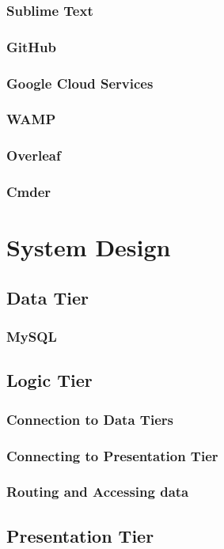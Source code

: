 \subsection{Sublime Text}
\subsection{GitHub}
\subsection{Google Cloud Services}
\subsection{WAMP}
\subsection{Overleaf}
\subsection{Cmder}

\chapter{System Design}

\section{Data Tier}
\subsection{MySQL}

\section{Logic Tier}
\subsection{Connection to Data Tiers}
\subsection{Connecting to Presentation Tier}
\subsection{Routing and Accessing data}


\section{Presentation Tier}
